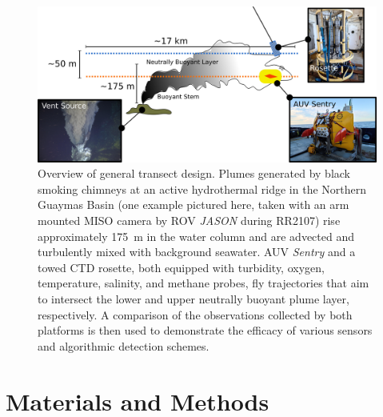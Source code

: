 \begin{figure}[h!]
    \centering
    \includegraphics[width=\columnwidth]{figures/chap3_schematic.jpg}
    \caption{Overview of general transect design. Plumes generated by black smoking chimneys at an active hydrothermal ridge in the Northern Guaymas Basin (one example pictured here, taken with an arm mounted MISO camera by ROV \emph{JASON} during RR2107) rise approximately \SI{175}{\meter} in the water column and are advected and turbulently mixed with background seawater. AUV \emph{Sentry} and a towed CTD rosette, both equipped with turbidity, oxygen, temperature, salinity, and methane probes, fly trajectories that aim to intersect the lower and upper neutrally buoyant plume layer, respectively. A comparison of the observations collected by both platforms is then used to demonstrate the efficacy of various sensors and algorithmic detection schemes.}
    \label{fig:schematic}
\end{figure}

\section{Materials and Methods}

